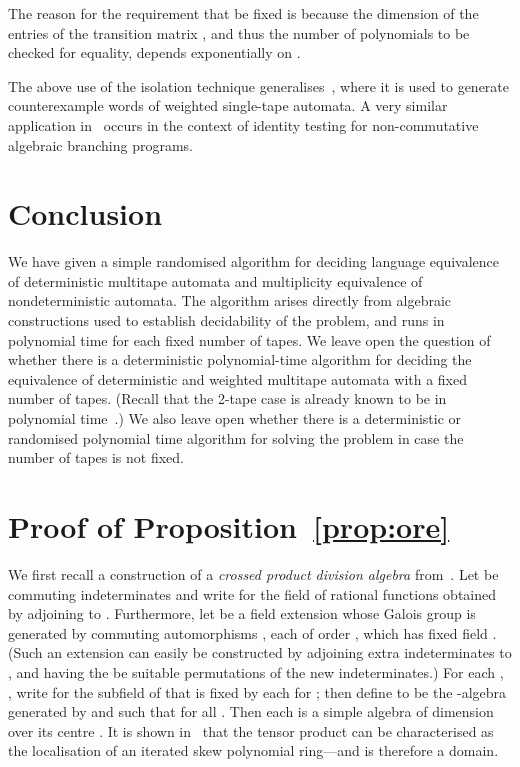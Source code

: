 \documentclass[runningheads]{llncs}
\begin{document}
The reason for the requirement that  be fixed is because the
dimension of the entries of the transition matrix , and thus the
number of polynomials to be checked for equality, depends
exponentially on .

The above use of the isolation technique
generalises~\cite{KieferMOWW13}, where it is used to generate
counterexample words of weighted single-tape automata.  A very similar
application in~\cite{ArvindM08} occurs in the context of identity
testing for non-commutative algebraic branching programs.

\section{Conclusion}
We have given a simple randomised algorithm for deciding language
equivalence of deterministic multitape automata and multiplicity
equivalence of nondeterministic automata.  The algorithm arises
directly from algebraic constructions used to establish decidability
of the problem, and runs in polynomial time for each fixed number of
tapes.  We leave open the question of whether there is a deterministic
polynomial-time algorithm for deciding the equivalence of
deterministic and weighted multitape automata with a fixed number of
tapes.  (Recall that the 2-tape case is already known to be in
polynomial time~\cite{FriedmanG82}.)  We also leave open whether there
is a deterministic or randomised polynomial time algorithm for solving
the problem in case the number of tapes is not fixed.






\appendix
\section{Proof of Proposition~\ref{prop:ore}}
\label{sec:appendix}
We first recall a construction of a \emph{crossed product division
  algebra} from~\cite[Proposition 1.1]{Saltman}.  Let 
be commuting indeterminates and write
 for the field of rational functions
obtained by adjoining  to .
Furthermore, let  be a field extension whose Galois group is
generated by commuting automorphisms , each
of order , which has fixed field .  (Such an extension can easily
be constructed by adjoining extra indeterminates to , and having
the  be suitable permutations of the new indeterminates.)
For each , , write  for the subfield of 
that is fixed by each  for ; then define  to
be the -algebra generated by  and  such that  for all .  Then each  is a simple
algebra of dimension  over its centre .  It is shown
in~\cite[Proposition 1.1]{Saltman} that the tensor product  can be characterised as the
localisation of an iterated skew polynomial ring---and is therefore a
domain.
\end{document}
